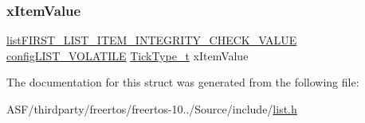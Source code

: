 \subsubsection{\texorpdfstring{xItemValue}{xItemValue}}
{\footnotesize\ttfamily \mbox{\hyperlink{list_8h_a3611bd5d5d87cb26ac1dc7a4852b94a0}{list\+F\+I\+R\+S\+T\+\_\+\+L\+I\+S\+T\+\_\+\+I\+T\+E\+M\+\_\+\+I\+N\+T\+E\+G\+R\+I\+T\+Y\+\_\+\+C\+H\+E\+C\+K\+\_\+\+V\+A\+L\+UE}} \mbox{\hyperlink{list_8h_a2d5de557c5561c8980d1bf51d87d8cba}{config\+L\+I\+S\+T\+\_\+\+V\+O\+L\+A\+T\+I\+LE}} \mbox{\hyperlink{portmacro_8h_aa69c48c6e902ce54f70886e6573c92a9}{Tick\+Type\+\_\+t}} x\+Item\+Value}



The documentation for this struct was generated from the following file\+:\begin{DoxyCompactItemize}
\item 
A\+S\+F/thirdparty/freertos/freertos-\/10../\+Source/include/\mbox{\hyperlink{list_8h}{list.\+h}}\end{DoxyCompactItemize}
